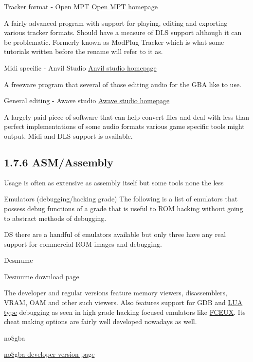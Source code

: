 \documentclass[
]{book}
\begin{document}
Tracker format - Open MPT \href{http://openmpt.org/}{Open MPT homepage}

A fairly advanced program with support for playing, editing and exporting various tracker formats. Should have a measure of DLS support although it can be problematic. Formerly known as ModPlug Tracker which is what some tutorials written before the rename will refer to it as.

Midi specific - Anvil Studio \href{http://www.anvilstudio.com/}{Anvil studio homepage}

A freeware program that several of those editing audio for the GBA like to use.

General editing - Awave studio \href{http://www.fmjsoft.com/awframe.html}{Awave studio homepage}

A largely paid piece of software that can help convert files and deal with less than perfect implementations of some audio formats various game specific tools might output. Midi and DLS support is available.

\hypertarget{asmassembly}{%
\subsection{1.7.6 ASM/Assembly}\label{asmassembly}}

Usage is often as extensive as assembly itself but some tools none the less

Emulators (debugging/hacking grade) The following is a list of emulators that possess debug functions of a grade that is useful to ROM hacking without going to abstract methods of debugging.

DS there are a handful of emulators available but only three have any real support for commercial ROM images and debugging.

Desmume

\href{http://desmume.org/download/}{Desmume download page}

The developer and regular versions feature memory viewers, disassemblers, VRAM, OAM and other such viewers. Also features support for GDB and \href{http://wiki.desmume.org/index.php?title=Faq\#What_is_this_Lua_stuff_I_see.3F}{LUA type} debugging as seen in high grade hacking focused emulators like \href{http://www.fceux.com/web/help/LuaScripting.html}{FCEUX}. Its cheat making options are fairly well developed nowadays as well.

no\$gba

\href{http://problemkaputt.de/gba-dev.htm}{no\$gba developer version page}
\end{document}
